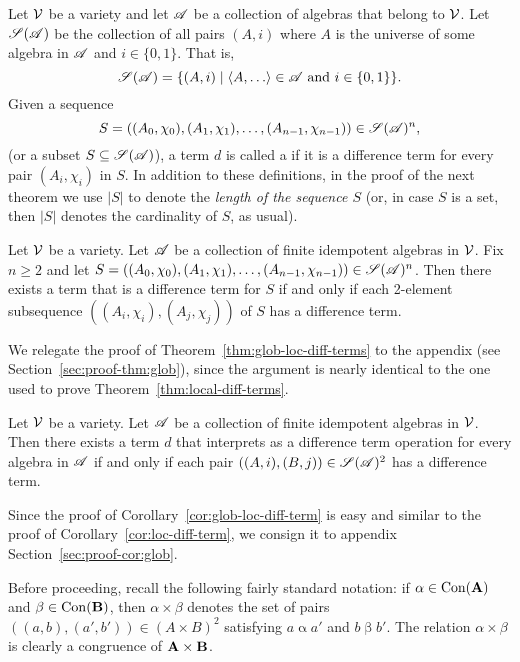 Let $\mathcal{V}$ be a variety and let $\mathscr{A}$ be a collection of algebras that belong to $\mathcal{V}$.
Let $\mathscr{S}(\mathscr{A})$ be the collection of all pairs $(A, i)$ where $A$ is the universe
of some algebra in $\mathscr{A}$ and $i\in \{0,1\}$.  That is,
\[
\scS(\scA) = \{(A, i) \mid \<A, \dots\> \in \scA \text{ and } i \in \{0,1\}\}.
\]
Given a sequence
\[S = ((A_0, \chi_0), (A_1, \chi_1), \dots,
(A_{n-1},\chi_{n-1})) \in \mathscr{S}(\mathscr{A})^n,
\]
(or a subset $S \subseteq \mathscr{S}(\mathscr{A})$),
a term $d$ is called a 
if it is a \glocal difference term for every pair $(A_i, \chi_i)$ in $S$.
In addition to these definitions, in the proof of the next theorem we use
$|S|$ to denote the \emph{length of the sequence $S$}
(or, in case $S$ is a set, then $|S|$ denotes the cardinality of $S$, as usual).
\begin{thm}
  \label{thm:glob-loc-diff-terms}
  Let $\mathcal{V}$ be a variety.  Let $\mathscr{A}$ be a collection of finite idempotent
  algebras in $\mathcal{V}$. Fix $n\geq 2$ and 
  let $S= ((A_0, \chi_0), (A_1, \chi_1), \dots, (A_{n-1}, \chi_{n-1}))\in \mathscr{S}(\mathscr{A})^n$.
  Then there exists a term that is a \glocal difference term for $S$
  if and only if each 2-element subsequence $((A_i,\chi_i), (A_j,\chi_j))$ of $S$
  has a \glocal difference term.
\end{thm}
We relegate the proof of Theorem~\ref{thm:glob-loc-diff-terms} 
to the appendix (see Section~\ref{sec:proof-thm:glob}), since the argument 
is nearly identical to the one used to prove Theorem~\ref{thm:local-diff-terms}. 

\begin{cor}
  \label{cor:glob-loc-diff-term}
  Let $\mathcal{V}$ be a variety.  Let $\mathscr{A}$ be a collection of finite idempotent
  algebras in $\mathcal{V}$. %
  Then there exists a term $d$ that interprets as a difference term operation
  for every algebra in $\mathscr{A}$
  if and only if each pair $((A,i), (B,j)) \in \mathscr{S}(\mathscr{A})^2$ has a \glocal
  difference term.
\end{cor}
Since the proof of Corollary~\ref{cor:glob-loc-diff-term}
is easy and similar to the proof
of Corollary~\ref{cor:loc-diff-term}, we consign it to 
appendix Section~\ref{sec:proof-cor:glob}.

Before proceeding, recall the following fairly standard notation:
if $\alpha \in \operatorname{Con}(\mathbf{A})$ and $\beta \in \operatorname{Con}(\mathbf{B})$, then
$\alpha \times \beta$ denotes the set of pairs $((a,b),(a',b'))\in (A\times B)^2$ satisfying
$a \mathrel{\alpha} a'$ and $b \mathrel{\beta} b'$.  The relation 
$\alpha \times \beta$ is clearly a congruence of $\mathbf{A} \times \mathbf{B}$.

